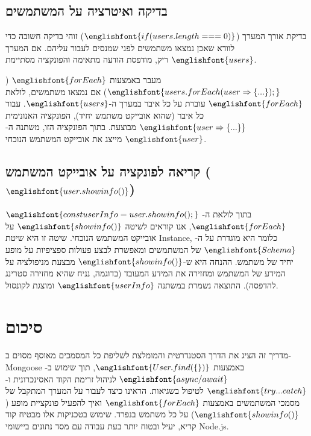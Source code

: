 \documentclass[12pt]{article}
\begin{document}
\subsection{בדיקה ואיטרציה על המשתמשים}
\begin{codeExplanationBox}{בדיקת אורך המערך (\(\englishfont{if (users.length === 0)}\))}
  זוהי בדיקה חשובה כדי לוודא שאכן נמצאו משתמשים לפני שמנסים לעבור עליהם. אם המערך \(\englishfont{users}\) ריק, מודפסת הודעה מתאימה והפונקציה מסתיימת.
\end{codeExplanationBox}
\begin{codeExplanationBox}{מעבר באמצעות \(\englishfont{forEach}\) (\(\englishfont{users.forEach(user \Rightarrow \{ ... \});}\))}
  אם נמצאו משתמשים, לולאת \(\englishfont{forEach}\) עוברת על כל איבר במערך ה-\(\englishfont{users}\). עבור כל איבר (שהוא אובייקט משתמש יחיד), הפונקציה האנונימית \(\englishfont{user \Rightarrow \{ ... \}}\) מבוצעת. בתוך הפונקציה הזו, משתנה ה-\(\englishfont{user}\) מייצג את אובייקט המשתמש הנוכחי.
\end{codeExplanationBox}

\subsection{קריאה לפונקציה על אובייקט המשתמש (\(\englishfont{user.showinfo()}\))}
\begin{codeExplanationBox}{\(\englishfont{const userInfo = user.showinfo();}\)}
  בתוך לולאת ה-\(\englishfont{forEach}\), אנו קוראים לשיטה \(\englishfont{showinfo()}\) על אובייקט המשתמש הנוכחי. שיטה זו היא שיטת Instance, כלומר היא מוגדרת על ה-\(\englishfont{Schema}\) של המשתמשים ומאפשרת לבצע פעולות ספציפיות על מופע יחיד של משתמש. ההנחה היא ש-\(\englishfont{showinfo()}\) מבצעת מניפולציה על המידע של המשתמש ומחזירה את המידע המעובד (בדוגמה, נניח שהיא מחזירה סטרינג להדפסה). התוצאה נשמרת במשתנה \(\englishfont{userInfo}\) ומוצגת לקונסול.
\end{codeExplanationBox}

\section{סיכום}

מדריך זה הציג את הדרך הסטנדרטית והמומלצת לשליפת כל המסמכים מאוסף מסוים ב-Mongoose באמצעות \(\englishfont{User.find(\{\})}\), תוך שימוש ב-\(\englishfont{async/await}\) לניהול זרימת הקוד האסינכרונית ו-\(\englishfont{try...catch}\) לטיפול בשגיאות. הראינו כיצד לעבור על המערך המתקבל של מסמכי המשתמשים באמצעות \(\englishfont{forEach}\) ואיך להפעיל פונקציית מופע (\(\englishfont{showinfo()}\)) על כל משתמש בנפרד. שימוש בטכניקות אלו מבטיח קוד קריא, יעיל ובטוח יותר בעת עבודה עם מסד נתונים ביישומי Node.js.
\end{document}
